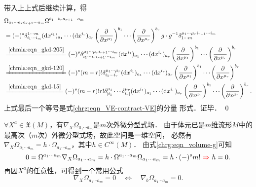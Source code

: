 带入上上式后继续计算，得
\begin{align*}
    &\Omega_{a_1 \cdots a_r a_{r+1} \cdots a_m}
    \Omega^{{b_1 \cdots b_r} a_{r+1} \cdots a_m} \\
   &= (-)^s \delta_{i_1 \cdots i_m}^{1 \cdots m}
    ({\rm d}x^{i_{1}})_{a_{1}}  \cdots  ({\rm d}x^{i_r})_{a_r}
    \left(\frac{\partial }{\partial x^{\mu_1}}\right) ^{b_1} \cdots
    \left(\frac{\partial }{\partial x^{\mu_r}}\right) ^{b_r}
    g\cdot g^{-1}\delta^{\mu_1 \cdots\mu_r i_{r+1}\cdots i_m}_{1 \cdots m} \\
   &\xlongequal{\ref{chmla:eqn_gkd-205}} (-)^s
     \delta_{i_1 \cdots i_r i_{r+1}\cdots i_m}^{\mu_1 \cdots\mu_r i_{r+1}\cdots i_m}
    ({\rm d}x^{i_{1}})_{a_{1}}  \cdots  ({\rm d}x^{i_r})_{a_r}
    \left(\frac{\partial }{\partial x^{\mu_1}}\right) ^{b_1} \cdots
    \left(\frac{\partial }{\partial x^{\mu_r}}\right) ^{b_r} \\
   &\xlongequal{\ref{chmla:eqn_gkd-120}} (-)^s
   (m-r)! \delta^{\mu_1 \cdots \mu_{r}}_{i_1 \cdots i_{r}}
   ({\rm d}x^{i_{1}})_{a_{1}}  \cdots  ({\rm d}x^{i_r})_{a_r}
   \left(\frac{\partial }{\partial x^{\mu_1}}\right) ^{b_1} \cdots
   \left(\frac{\partial }{\partial x^{\mu_r}}\right) ^{b_r} \\
   &\xlongequal{\ref{chmla:eqn_gkd-15} } (-)^s (m-r)! r!
   \delta_{\lbrack i_1}^{\mu_1} \cdots \delta_{i_r \rbrack}^{\mu_r}
      ({\rm d}x^{i_{1}})_{a_{1}}  \cdots  ({\rm d}x^{i_r})_{a_r}
   \left(\frac{\partial }{\partial x^{\mu_1}}\right) ^{b_1} \cdots
   \left(\frac{\partial }{\partial x^{\mu_r}}\right) ^{b_r} .
\end{align*}
上式最后一个等号是式\eqref{chrg:eqn_VE-contract-VE}的分量
形式．证毕． \qed


$\forall X^a\in \mathfrak{X}(M)$，有$\nabla_X\Omega_{a_1 \cdots a_m}$是$m$次外微分型式场．
由于体元已是$m$维流形$M$中的最高次（$m$次）外微分型式场，故此空间是一维空间，
必然有$\nabla_X\Omega_{a_1 \cdots a_m} = h\cdot \Omega_{a_1 \cdots a_m}$，其中$h\in C^\infty(M)$．
由式\eqref{chrg:eqn_volume-g}可知
\begin{equation}
    0= \Omega^{a_1 \cdots a_m} \nabla_X\Omega_{a_1 \cdots a_m}
    = h \cdot \Omega^{a_1 \cdots a_m} \Omega_{a_1 \cdots a_m}
    = h\cdot (-)^s m! {\ \color{red}\Rightarrow\  } h=0.
\end{equation}
再因$X^a$的任意性，可得到一个常用公式
\begin{equation}\label{chrg:eqn_dVE=0}
    \nabla_X\Omega_{a_1 \cdots a_m} = 0 \quad \Leftrightarrow \quad
    \nabla_b\Omega_{a_1 \cdots a_m} = 0 .
\end{equation}

